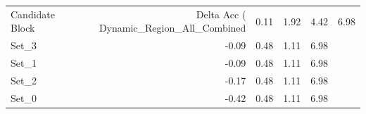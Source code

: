\begin{tabular}{lrrrr}
\toprule
Candidate Block & Delta Acc (%
\midrule
Dynamic_Region_All_Combined & 0.11 & 1.92 & 4.42 & 6.98 \\
Set_3 & -0.09 & 0.48 & 1.11 & 6.98 \\
Set_1 & -0.09 & 0.48 & 1.11 & 6.98 \\
Set_2 & -0.17 & 0.48 & 1.11 & 6.98 \\
Set_0 & -0.42 & 0.48 & 1.11 & 6.98 \\
\bottomrule
\end{tabular}
